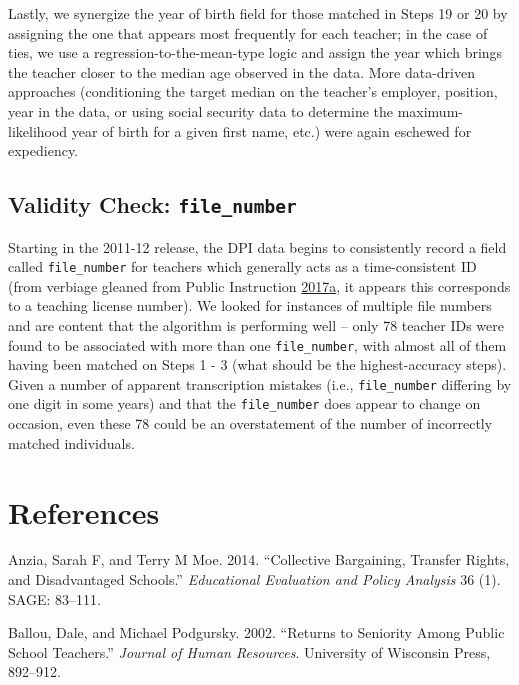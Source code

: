 \documentclass[12pt,]{article}
\newcommand{\TAG}[1]{}
\begin{document}
Lastly, we synergize the year of birth field for those matched in Steps
19 or 20 by assigning the one that appears most frequently for each
teacher; in the case of ties, we use a regression-to-the-mean-type logic
and assign the year which brings the teacher closer to the median age
observed in the data. More data-driven approaches (conditioning the
target median on the teacher's employer, position, year in the data, or
using social security data to determine the maximum-likelihood year of
birth for a given first name, etc.) were again eschewed for expediency.

\subsection{\texorpdfstring{Validity Check:
\texttt{file\_number}}{Validity Check: file\_number}}\label{validity-check-file_number}

Starting in the 2011-12 release, the DPI data begins to consistently
record a field called \texttt{file\_number} for teachers which generally
acts as a time-consistent ID (from verbiage gleaned from Public
Instruction
\protect\hyperlink{ref-dpi_errata}{2017}\protect\hyperlink{ref-dpi_errata}{a},
it appears this corresponds to a teaching license number). We looked for
instances of multiple file numbers and are content that the algorithm is
performing well -- only 78 teacher IDs were found to be associated with
more than one \texttt{file\_number}, with almost all of them having been
matched on Steps 1 - 3 (what should be the highest-accuracy steps).
Given a number of apparent transcription mistakes (i.e.,
\texttt{file\_number} differing by one digit in some years) and that the
\texttt{file\_number} does appear to change on occasion, even these 78
could be an overstatement of the number of incorrectly matched
individuals.

\TAG{END_APPENDIX}

\section*{References}\label{references}

\hypertarget{refs}{}
\hypertarget{ref-anzia}{}
Anzia, Sarah F, and Terry M Moe. 2014. ``Collective Bargaining, Transfer
Rights, and Disadvantaged Schools.'' \emph{Educational Evaluation and
Policy Analysis} 36 (1). SAGE: 83--111.

\hypertarget{ref-ballou}{}
Ballou, Dale, and Michael Podgursky. 2002. ``Returns to Seniority Among
Public School Teachers.'' \emph{Journal of Human Resources}. University
of Wisconsin Press, 892--912.
\end{document}
